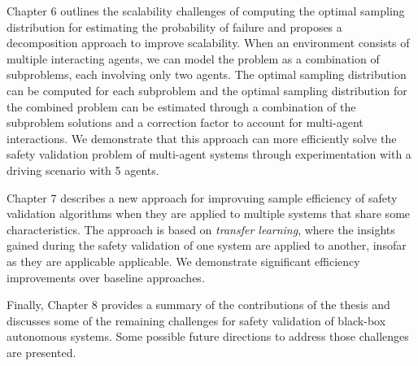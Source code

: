 Chapter 6 outlines the scalability challenges of computing the optimal sampling distribution for estimating the probability of failure and proposes a decomposition approach to improve scalability. When an environment consists of multiple interacting agents, we can model the problem as a combination of subproblems, each involving only two agents. The optimal sampling distribution can be computed for each subproblem and the optimal sampling distribution for the combined problem can be estimated through a combination of the subproblem solutions and a correction factor to account for multi-agent interactions. We demonstrate that this approach can more efficiently solve the safety validation problem of multi-agent systems through experimentation with a driving scenario with \num{5} agents. 

Chapter 7 describes a new approach for improvuing sample efficiency of safety validation algorithms when they are applied to multiple systems that share some characteristics. The approach is based on \emph{transfer learning}, where the insights gained during the safety validation of one system are applied to another, insofar as they are applicable applicable. We demonstrate significant efficiency improvements over baseline approaches.  

Finally, Chapter 8 provides a summary of the contributions of the thesis and discusses some of the remaining challenges for safety validation of black-box autonomous systems. Some possible future directions to address those challenges are presented. 
